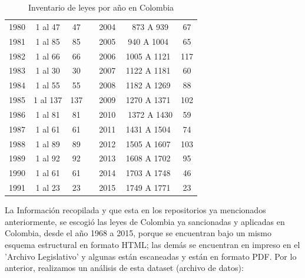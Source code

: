 \documentclass[conference]{IEEEtran}\usepackage[]{graphicx}\usepackage[]{color}
\begin{document}
\begin{table}[h]
\begin{tabular}{|c|c|c|r|c|c|c|}
		1980 &    1 al 47 &         47 &            &       2004 &  873 A 939 &         67 \\
		
		1981 &    1 al 85 &         85 &            &       2005 & 940 A 1004 &         65 \\
		
		1982 &    1 al 66 &         66 &            &       2006 & 1005 A 1121 &        117 \\
		
		1983 &    1 al 30 &         30 &            &       2007 & 1122 A 1181 &         60 \\
		
		1984 &    1 al 55 &         55 &            &       2008 & 1182 A 1269 &         88 \\
		
		1985 &   1 al 137 &        137 &            &       2009 & 1270 A 1371 &        102 \\
		
		1986 &    1 al 81 &         81 &            &       2010 &  1372 A 1430 &         59 \\
		
		1987 &    1 al 61 &         61 &            &       2011 & 1431 A 1504 &         74 \\
		
		1988 &    1 al 89 &         89 &            &       2012 & 1505 A 1607 &        103 \\
		
		1989 &    1 al 92 &         92 &            &       2013 & 1608 A 1702 &         95 \\
		
		1990 &    1 al 61 &         61 &            &       2014 & 1703 A 1748 &         46 \\
		
		1991 &    1 al 23 &         23 &            &       2015 & 1749 A 1771 &         23 \\
		
	\end{tabular}  
	\caption{Inventario de leyes por año en Colombia}
	\label{inventario_leyes}
\end{table}

La Información recopilada y que esta en los repositorios ya mencionados anteriormente, se escogió las leyes de Colombia ya sancionadas y aplicadas en Colombia, desde el año 1968 a 2015, porque se encuentran bajo un mismo esquema estructural en formato HTML; las demás se encuentran en impreso en el 'Archivo Legislativo' y algunas están escaneadas y están en formato PDF. Por lo anterior, realizamos un análisis de esta dataset (archivo de datos):
\end{document}

